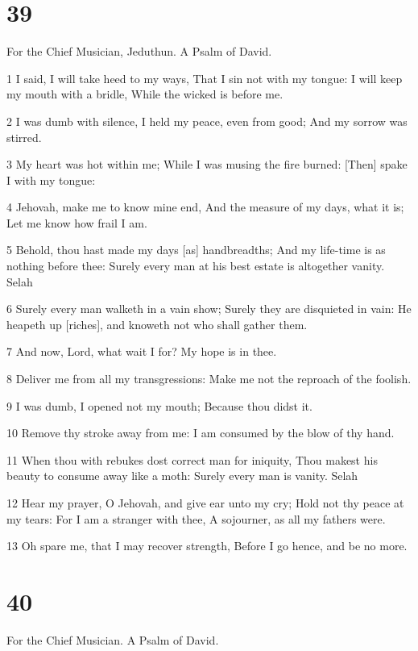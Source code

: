 \chapter{39}

\par For the Chief Musician, Jeduthun. A Psalm of David.

\par 1 I said, I will take heed to my ways, That I sin not with my tongue: I will keep my mouth with a bridle, While the wicked is before me.
\par 2 I was dumb with silence, I held my peace, even from good; And my sorrow was stirred.
\par 3 My heart was hot within me; While I was musing the fire burned: [Then] spake I with my tongue:
\par 4 Jehovah, make me to know mine end, And the measure of my days, what it is; Let me know how frail I am.
\par 5 Behold, thou hast made my days [as] handbreadths; And my life-time is as nothing before thee: Surely every man at his best estate is altogether vanity. Selah
\par 6 Surely every man walketh in a vain show; Surely they are disquieted in vain: He heapeth up [riches], and knoweth not who shall gather them.
\par 7 And now, Lord, what wait I for? My hope is in thee.
\par 8 Deliver me from all my transgressions: Make me not the reproach of the foolish.
\par 9 I was dumb, I opened not my mouth; Because thou didst it.
\par 10 Remove thy stroke away from me: I am consumed by the blow of thy hand.
\par 11 When thou with rebukes dost correct man for iniquity, Thou makest his beauty to consume away like a moth: Surely every man is vanity. Selah
\par 12 Hear my prayer, O Jehovah, and give ear unto my cry; Hold not thy peace at my tears: For I am a stranger with thee, A sojourner, as all my fathers were.
\par 13 Oh spare me, that I may recover strength, Before I go hence, and be no more.

\chapter{40}

\par For the Chief Musician. A Psalm of David.


